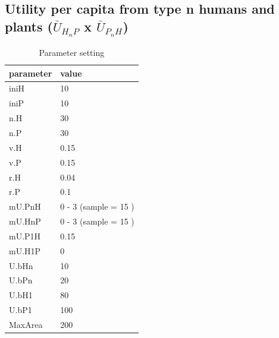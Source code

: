 \documentclass[]{book}
\begin{document}
\hypertarget{utility-per-capita-from-type-n-humans-and-plants-baru_h_np-x-baru_p_nh}{%
\subsection{\texorpdfstring{Utility per capita from type n humans and plants (\(\bar{U}_{H_{n}P}\) x \(\bar{U}_{P_{n}H}\))}{Utility per capita from type n humans and plants (\textbackslash{}bar\{U\}\_\{H\_\{n\}P\} x \textbackslash{}bar\{U\}\_\{P\_\{n\}H\})}}\label{utility-per-capita-from-type-n-humans-and-plants-baru_h_np-x-baru_p_nh}}


\begin{table}[!h]

\caption{\label{tab:3mUHnPmUPnHtablepdf}Parameter setting}
\centering
\begin{tabular}{l|l}
\hline
parameter & value\\
\hline
iniH & 10\\
\hline
iniP & 10\\
\hline
n.H & 30\\
\hline
n.P & 30\\
\hline
v.H & 0.15\\
\hline
v.P & 0.15\\
\hline
r.H & 0.04\\
\hline
r.P & 0.1\\
\hline
mU.PnH & 0 - 3 (sample = 15 )\\
\hline
mU.HnP & 0 - 3 (sample = 15 )\\
\hline
mU.P1H & 0.15\\
\hline
mU.H1P & 0\\
\hline
U.bHn & 10\\
\hline
U.bPn & 20\\
\hline
U.bH1 & 80\\
\hline
U.bP1 & 100\\
\hline
MaxArea & 200\\
\hline
\end{tabular}
\end{table}

\newpage
\end{document}
